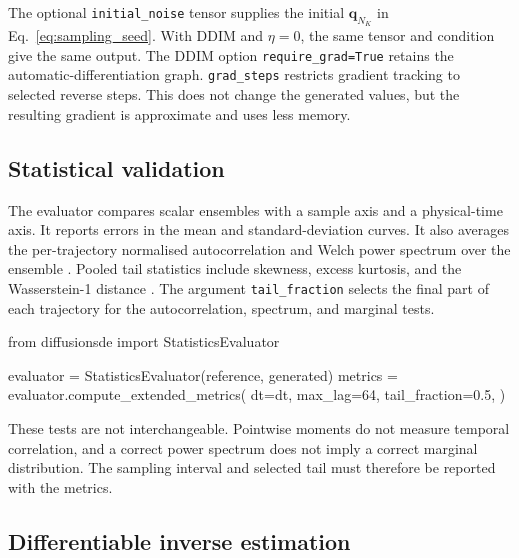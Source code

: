 The optional \texttt{initial\_noise} tensor supplies the initial
$\mathbf{q}_{N_K}$ in Eq.~\eqref{eq:sampling_seed}. With DDIM and $\eta=0$, the
same tensor and condition give the same output. The DDIM option
\texttt{require\_grad=True} retains the automatic-differentiation graph.
\texttt{grad\_steps} restricts gradient tracking to selected reverse steps. This
does not change the generated values, but the resulting gradient is approximate
and uses less memory.

\subsection{Statistical validation}
\label{ssec:evaluation}

The evaluator compares scalar ensembles with a sample axis and a physical-time
axis. It reports errors in the mean and standard-deviation curves. It also averages
the per-trajectory normalised autocorrelation and Welch power spectrum over the
ensemble \cite{welch1967psd}. Pooled tail statistics include skewness, excess
kurtosis, and the Wasserstein-1 distance \cite{villani2009optimal}. The argument
\texttt{tail\_fraction} selects the final part of each trajectory for the
autocorrelation, spectrum, and marginal tests.

\begin{pythonlisting}
from diffusionsde import StatisticsEvaluator

evaluator = StatisticsEvaluator(reference, generated)
metrics = evaluator.compute_extended_metrics(
    dt=dt, max_lag=64, tail_fraction=0.5,
)
\end{pythonlisting}

These tests are not interchangeable. Pointwise moments do not measure temporal
correlation, and a correct power spectrum does not imply a correct marginal
distribution. The sampling interval and selected tail must therefore be reported
with the metrics.

\subsection{Differentiable inverse estimation}
\label{ssec:inverse}

